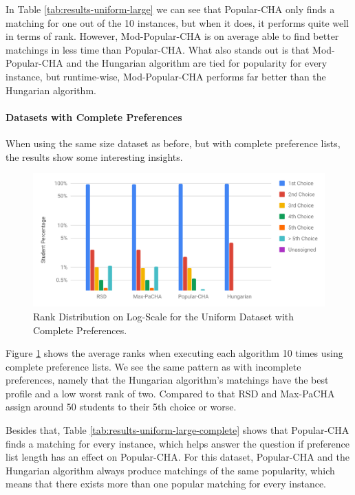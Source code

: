 In Table \ref{tab:results-uniform-large} we can see that Popular-CHA only finds a matching for one out of the 10 instances, but when it does, it performs quite well in terms of rank. However, Mod-Popular-CHA is on average able to find better matchings in less time than Popular-CHA. What also stands out is that Mod-Popular-CHA and the Hungarian algorithm are tied for popularity for every instance, but runtime-wise, Mod-Popular-CHA performs far better than the Hungarian algorithm.

\paragraph{Datasets with Complete Preferences}
When using the same size dataset as before, but with complete preference lists, the results show some interesting insights.

\begin{figure}[h!]
  \centering
    \includegraphics[width=0.75\linewidth]{assets/plots/uniform_compl_distr.pdf}
    \caption{Rank Distribution on Log-Scale for the Uniform Dataset with Complete Preferences.}
    \label{fig:uniform-complete-distribution}
\end{figure}

Figure \ref{fig:uniform-complete-distribution} shows the average ranks when executing each algorithm 10 times using complete preference lists. We see the same pattern as with incomplete preferences, namely that the Hungarian algorithm's matchings have the best profile and a low worst rank of two. Compared to that RSD and Max-PaCHA assign around 50 students to their 5th choice or worse.

Besides that, Table \ref{tab:results-uniform-large-complete} shows that Popular-CHA finds a matching for every instance, which helps answer the question if preference list length has an effect on Popular-CHA. For this dataset, Popular-CHA and the Hungarian algorithm always produce matchings of the same popularity, which means that there exists more than one popular matching for every instance. 

